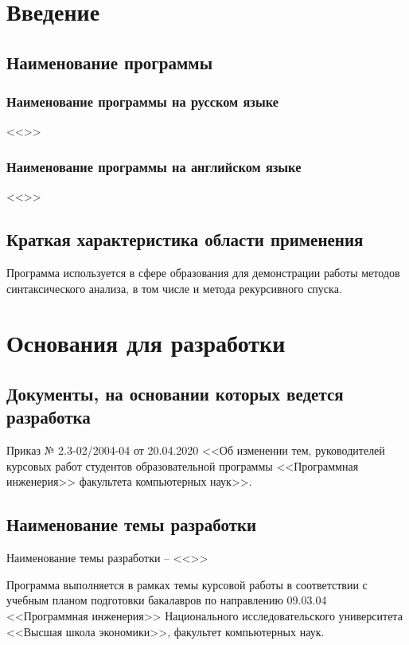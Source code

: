 \documentclass[a4paper,12pt,reqno]{article}
\begin{document}
  \CRTpreamble

  \section{Введение}
  \subsection{Наименование программы}
  \subsubsection{Наименование программы на русском языке}
  <<\CRTname>>
  \subsubsection{Наименование программы на английском языке}
  <<\CRTnameeng>>

  \subsection{Краткая характеристика области применения}
  Программа используется в сфере образования для демонстрации работы
  методов синтаксического анализа, в том числе и метода рекурсивного спуска.

  \newpage
  \section{Основания для разработки}
  \subsection{Документы, на основании которых ведется разработка}
  Приказ № 2.3-02/2004-04 от 20.04.2020 <<Об изменении тем, руководителей курсовых работ студентов образовательной программы
  <<Программная инженерия>> факультета компьютерных наук>>.

  \subsection{Наименование темы разработки}
  Наименование темы разработки -- <<\CRTname>>

  Программа выполняется в рамках темы курсовой работы в соответствии с учебным планом подготовки бакалавров по направлению 09.03.04 <<Программная инженерия>> Национального исследовательского университета <<Высшая школа экономики>>, факультет компьютерных наук.
\end{document}
